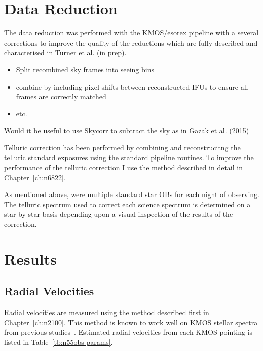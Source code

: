 \section{Data Reduction} %
\label{sec:data_reduction}

The data reduction was performed with the KMOS/esorex pipeline with a several corrections to improve the quality of the reductions which are fully described and characterised in Turner et al. (in prep).

\begin{itemize}
    \item Split recombined sky frames into seeing bins
    \item combine by including pixel shifts between reconstructed IFUs to ensure all frames are correctly matched
    \item etc.
\end{itemize}

Would it be useful to use Skycorr to subtract the sky as in Gazak et al. (2015)

Telluric correction has been performed by combining and reconstrucitng the telluric standard exposures using the standard pipeline routines.
To improve the performance of the telluric correction I use the method described in detail in Chapter~\ref{ch:n6822}.

As mentioned above, were multiple standard star OBs for each night of observing.
The telluric spectrum used to correct each science spectrum is determined on a star-by-star basis depending upon a visual inspection of the results of the correction.


\section{Results} %
\label{sec:results}

\subsection{Radial Velocities} %
\label{sub:rvs}
Radial velocities are measured using the method described first in Chapter~\ref{ch:n2100}.
This method is known to work well on KMOS stellar spectra from previous studies~\cite{2015ApJ...798...23L,2015ApJ...803...14P,2016arXiv160202702P}.
Estimated radial velocities from each KMOS pointing is listed in Table~\ref{tb:n55obs-params}.




